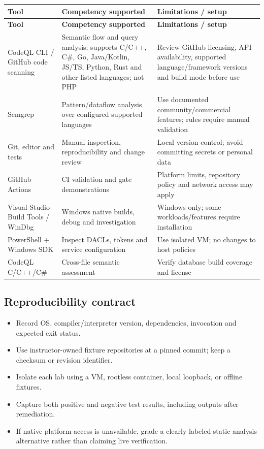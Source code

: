 \documentclass[10pt,letterpaper]{article}
\begin{document}
\begingroup\footnotesize\setlength\tabcolsep{3pt}
\begin{longtable}{>{\raggedright\arraybackslash}p{}>{\raggedright\arraybackslash}p{}>{\raggedright\arraybackslash}p{}}\toprule
\textbf{Tool} & \textbf{Competency supported} & \textbf{Limitations / setup}\\\midrule\endfirsthead
\toprule \textbf{Tool} & \textbf{Competency supported} & \textbf{Limitations / setup}\\\midrule\endhead
CodeQL CLI / GitHub code scanning & Semantic flow and query analysis; supports C/C++, C\#, Go, Java/Kotlin, JS/TS, Python, Rust and other listed languages; not PHP & Review GitHub licensing, API availability, supported language/framework versions and build mode before use\\\midrule
Semgrep & Pattern/dataflow analysis over configured supported languages & Use documented community/commercial features; rules require manual validation\\\midrule
Git, editor and tests & Manual inspection, reproducibility and change review & Local version control; avoid committing secrets or personal data\\\midrule
GitHub Actions & CI validation and gate demonstrations & Platform limits, repository policy and network access may apply\\\midrule
Visual Studio Build Tools / WinDbg & Windows native builds, debug and investigation & Windows-only; some workloads/features require installation\\\midrule
PowerShell + Windows SDK & Inspect DACLs, tokens and service configuration & Use isolated VM; no changes to host policies\\\midrule
CodeQL C/C++/C\# & Cross-file semantic assessment & Verify database build coverage and license\\\midrule
\bottomrule\end{longtable}\endgroup
\subsection{Reproducibility contract}
\begin{itemize}[leftmargin=*,itemsep=2pt]
\item Record OS, compiler/interpreter version, dependencies, invocation and expected exit status.
\item Use instructor-owned fixture repositories at a pinned commit; keep a checksum or revision identifier.
\item Isolate each lab using a VM, rootless container, local loopback, or offline fixtures.
\item Capture both positive and negative test results, including outputs after remediation.
\item If native platform access is unavailable, grade a clearly labeled static-analysis alternative rather than claiming live verification.
\end{itemize}
\end{document}
